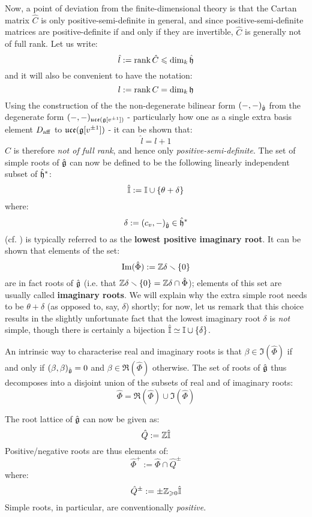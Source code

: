         Now, a point of deviation from the finite-dimensional theory is that the Cartan matrix $\hat{C}$ is only positive-semi-definite in general, and since positive-semi-definite matrices are positive-definite if and only if they are invertible, $\hat{C}$ is generally not of full rank. Let us write:
            $$\hat{l} := \operatorname{rank} \hat{C} \leqslant \dim_k \hat{\mathfrak{h}}$$
        and it will also be convenient to have the notation:
            $$l := \operatorname{rank} C = \dim_k \mathfrak{h}$$
        Using the construction of the the non-degenerate bilinear form $(-, -)_{\hat{\mathfrak{g}}}$ from the degenerate form $(-, -)_{\mathfrak{uce}(\mathfrak{g}[v^{\pm 1}])}$ - particularly how one as a single extra basis element $D_{\mathrm{aff}}$ to $\mathfrak{uce}(\mathfrak{g}[v^{\pm 1}])$ - it can be shown that:
            $$\hat{l} = l + 1$$
        $\hat{C}$ is therefore \textit{not of full rank}, and hence only \textit{positive-semi-definite}. The set of simple roots of $\hat{\mathfrak{g}}$ can now be defined to be the following linearly independent subset of $\hat{\mathfrak{h}}^*$:
            $$\hat{\mathbb{I}} := \mathbb{I} \cup \{\theta + \delta\}$$
        where:
            $$\delta := (c_v, -)_{\hat{\mathfrak{g}}} \in \hat{\mathfrak{h}}^*$$
        (cf. \cite[Section 7.4, p. 100]{kac_infinite_dimensional_lie_algebras}) is typically referred to as the \textbf{lowest positive imaginary root}. It can be shown that elements of the set:
            $$\operatorname{Im}(\hat{\Phi}) := \mathbb{Z}\delta \smallsetminus \{0\}$$
        are in fact roots of $\hat{\mathfrak{g}}$ (i.e. that $\mathbb{Z}\delta \smallsetminus \{0\} = \mathbb{Z}\delta \cap \hat{\Phi}$); elements of this set are usually called \textbf{imaginary roots}. We will explain why the extra simple root needs to be $\theta + \delta$ (as opposed to, say, $\delta$) shortly; for now, let us remark that this choice results in the slightly unfortunate fact that the lowest imaginary root $\delta$ is \textit{not} simple, though there is certainly a bijection $\hat{\mathbb{I}} \simeq \mathbb{I} \cup \{\delta\}$.

        An intrinsic way to characterise real and imaginary roots is that $\beta \in \Im(\hat{\Phi})$ if and only if $(\beta, \beta)_{\hat{\mathfrak{g}}} = 0$ and $\beta \in \Re(\hat{\Phi})$ otherwise. The set of roots of $\hat{\mathfrak{g}}$ thus decomposes into a disjoint union of the subsets of real and of imaginary roots:
            $$\hat{\Phi} = \Re(\hat{\Phi}) \cup \Im(\hat{\Phi})$$
        
        The root lattice of $\hat{\mathfrak{g}}$ can now be given as:
            $$\hat{Q} := \mathbb{Z}\hat{\mathbb{I}}$$
        Positive/negative roots are thus elements of:
            $$\hat{\Phi}^+ := \hat{\Phi} \cap \hat{Q}^{\pm}$$
        where:
            $$\hat{Q}^{\pm} := \pm\mathbb{Z}_{\geqslant 0}\hat{\mathbb{I}}$$
        Simple roots, in particular, are conventionally \textit{positive}.

